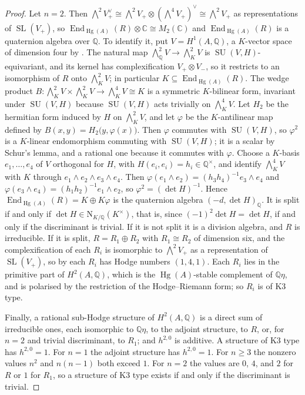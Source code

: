 \documentclass[11pt,reqno]{amsart}
\theoremstyle{plain}
\theoremstyle{definition}
\theoremstyle{remark}
\newcommand{\QQ}{\mathbb{Q}}
\newcommand{\CC}{\mathbb{C}}
\newcommand{\Nm}{\mathrm{N}}             %
\DeclareMathOperator{\End}{End}
\DeclareMathOperator{\Hg}{Hg}
\DeclareMathOperator{\SL}{SL}
\DeclareMathOperator{\SU}{SU}
\newcommand{\Kx}{K^{\times}}
\begin{document}
\begin{proof}
Let $n=2$. Then $\bigwedge^{2}V_{+}^{\vee}\cong\bigwedge^{2}V_{+}\otimes
(\bigwedge^{4}V_{+})^{\vee}\cong\bigwedge^{2}V_{+}$ as representations of
$\SL(V_{+})$, so $\End_{\Hg(A)}(R)\otimes\CC\cong M_{2}(\CC)$ and
$\End_{\Hg(A)}(R)$ is a quaternion algebra over $\QQ$. To identify it, put
$V=H^{1}(A,\QQ)$, a $K$-vector space of dimension four by .
The natural map $\bigwedge^{2}_{\QQ}V\to\bigwedge^{2}_{K}V$ is
$\SU(V,H)$-equivariant, and its kernel has complexification
$V_{+}\otimes V_{-}$, so it restricts to an isomorphism of $R$ onto
$\bigwedge^{2}_{K}V$; in particular $K\subseteq\End_{\Hg(A)}(R)$. The wedge
product $B\colon\bigwedge^{2}_{K}V\times\bigwedge^{2}_{K}V\to
\bigwedge^{4}_{K}V\cong K$ is a symmetric $K$-bilinear form, invariant under
$\SU(V,H)$ because $\SU(V,H)$ acts trivially on $\bigwedge^{4}_{K}V$. Let
$H_{2}$ be the hermitian form induced by $H$ on $\bigwedge^{2}_{K}V$, and let
$\varphi$ be the $K$-antilinear map defined by
$B(x,y)=H_{2}\bigl(y,\varphi(x)\bigr)$. Then $\varphi$ commutes with
$\SU(V,H)$, so $\varphi^{2}$ is a $K$-linear endomorphism commuting with
$\SU(V,H)$; it is a scalar by Schur's lemma, and a rational one because it
commutes with $\varphi$. Choose a $K$-basis $e_{1},\dots,e_{4}$ of $V$
orthogonal for $H$, with $H(e_{i},e_{i})=h_{i}\in\QQ^{\times}$, and identify
$\bigwedge^{4}_{K}V$ with $K$ through $e_{1}\wedge e_{2}\wedge e_{3}\wedge
e_{4}$. Then $\varphi(e_{1}\wedge e_{2})=(h_{3}h_{4})^{-1}e_{3}\wedge e_{4}$
and $\varphi(e_{3}\wedge e_{4})=(h_{1}h_{2})^{-1}e_{1}\wedge e_{2}$, so
$\varphi^{2}=(\det H)^{-1}$. Hence $\End_{\Hg(A)}(R)=K\oplus K\varphi$ is the
quaternion algebra $(-d,\det H)_{\QQ}$. It is split if and only if
$\det H\in\Nm_{K/\QQ}(\Kx)$, that is, since $(-1)^{2}\det H=\det H$, if and
only if the discriminant is trivial. If it is not split it is a division
algebra, and $R$ is irreducible. If it is split, $R=R_{1}\oplus R_{2}$ with
$R_{1}\cong R_{2}$ of dimension six, and the complexification of each $R_{i}$
is isomorphic to $\bigwedge^{2}V_{+}$ as a representation of $\SL(V_{+})$, so
by  each $R_{i}$ has Hodge numbers $(1,4,1)$. Each $R_{i}$
lies in the primitive part of $H^{2}(A,\QQ)$, which is the $\Hg(A)$-stable
complement of $\QQ\eta$, and is polarised by the restriction of the
Hodge--Riemann form; so $R_{i}$ is of K3 type.

Finally, a rational sub-Hodge structure of $H^{2}(A,\QQ)$ is a direct sum of
irreducible ones, each isomorphic to $\QQ\eta$, to the adjoint structure, to
$R$, or, for $n=2$ and trivial discriminant, to $R_{1}$; and $h^{2,0}$ is
additive. A structure of K3 type has $h^{2,0}=1$. For $n=1$ the adjoint
structure has $h^{2,0}=1$. For $n\ge3$ the nonzero values $n^{2}$ and
$n(n-1)$ both exceed $1$. For $n=2$ the values are $0$, $4$, and $2$ for $R$
or $1$ for $R_{1}$, so a structure of K3 type exists if and only if the
discriminant is trivial.
\end{proof}
\end{document}
